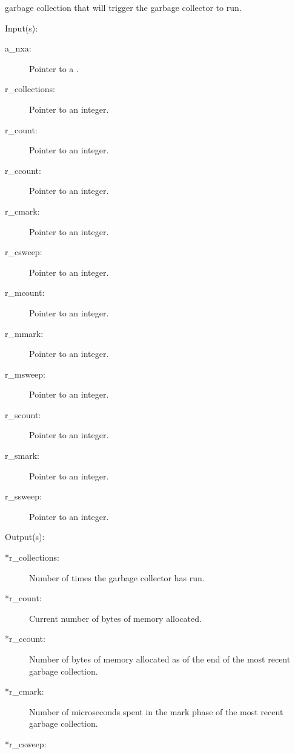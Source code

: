 \begin{capi}
\begin{capilist}
		garbage collection that will trigger the garbage collector to
		run.
	\end{capilist}
\label{nxa_stats_get}
	\begin{capilist}
	\item[Input(s): ]
		\begin{description}\item[]
		\item[a\_nxa: ]
			Pointer to a .
		\item[r\_collections: ]
			Pointer to an integer.
		\item[r\_count: ]
			Pointer to an integer.
		\item[r\_ccount: ]
			Pointer to an integer.
		\item[r\_cmark: ]
			Pointer to an integer.
		\item[r\_csweep: ]
			Pointer to an integer.
		\item[r\_mcount: ]
			Pointer to an integer.
		\item[r\_mmark: ]
			Pointer to an integer.
		\item[r\_msweep: ]
			Pointer to an integer.
		\item[r\_scount: ]
			Pointer to an integer.
		\item[r\_smark: ]
			Pointer to an integer.
		\item[r\_ssweep: ]
			Pointer to an integer.
		\end{description}
	\item[Output(s): ]
		\begin{description}\item[]
		\item[*r\_collections: ]
			Number of times the garbage collector has run.
		\item[*r\_count: ]
			Current number of bytes of memory allocated.
		\item[*r\_ccount: ]
			Number of bytes of memory allocated as of the end of the
			most recent garbage collection.
		\item[*r\_cmark: ]
			Number of microseconds spent in the mark phase of the
			most recent garbage collection.
		\item[*r\_csweep: ]

\end{description}
\end{capilist}
\end{capi}
